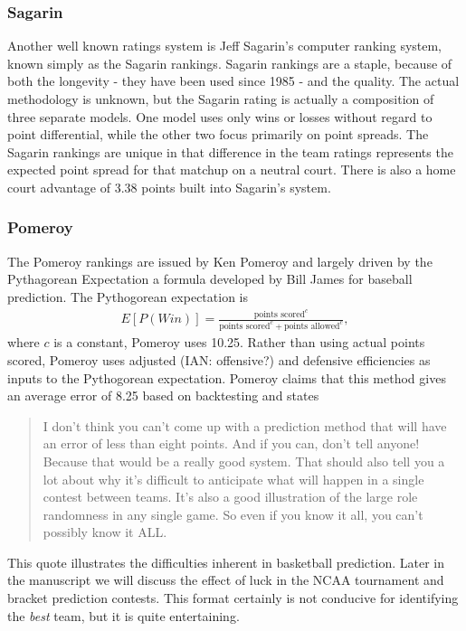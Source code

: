 \subsubsection{Sagarin}
Another well known ratings system is Jeff Sagarin's computer ranking system, known simply as the Sagarin rankings.  Sagarin rankings are a staple, because of both the longevity  - they have been used since 1985 - and the quality.  The actual methodology is unknown, but the Sagarin rating is actually a composition of three separate models.  One model uses only wins or losses without regard to point differential, while the other two focus primarily on point spreads.  The Sagarin rankings are unique in that difference in the team ratings represents the expected point spread for that matchup on a neutral court.  There is also a home court advantage of 3.38 points built into Sagarin's system.

\subsubsection{Pomeroy}
The Pomeroy rankings are issued by Ken Pomeroy and largely driven by the Pythagorean Expectation a formula developed by Bill James for baseball prediction.  The Pythogorean expectation is
\begin{eqnarray}
E[P(Win)] = \frac{\text{points scored}^c}{\text{points scored}^c + \text{points allowed}^c},
\end{eqnarray}
where $c$ is a constant, Pomeroy uses 10.25.  Rather than using actual points scored, Pomeroy uses adjusted (IAN: offensive?) and defensive efficiencies as inputs to the Pythogorean expectation.  Pomeroy claims that this method gives an average error of 8.25 based on backtesting and states
\begin{quotation}\noindent I don't think you can't come up with a prediction method that will have an error of less than eight points. And if you can, don't tell anyone! Because that would be a really good system. That should also tell you a lot about why it's difficult to anticipate what will happen in a single contest between teams. It's also a good illustration of the large role randomness in any single game. So even if you know it all, you can't possibly know it ALL.
\end{quotation}
This quote illustrates the difficulties inherent in basketball prediction.  Later in the manuscript we will discuss the effect of luck in the NCAA tournament and bracket prediction contests.  This format certainly is not conducive for identifying the \emph{best} team, but it is quite entertaining.
